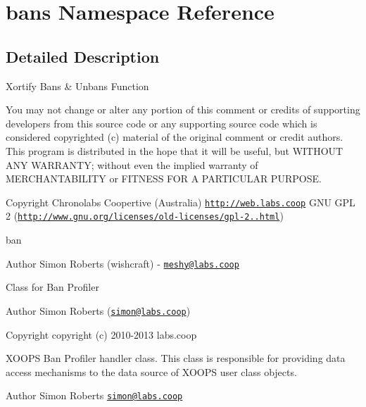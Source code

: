 \hypertarget{namespacebans}{\section{bans Namespace Reference}
\label{namespacebans}
}


\subsection{Detailed Description}
Xortify Bans \& Unbans Function

You may not change or alter any portion of this comment or credits of supporting developers from this source code or any supporting source code which is considered copyrighted (c) material of the original comment or credit authors. This program is distributed in the hope that it will be useful, but W\-I\-T\-H\-O\-U\-T A\-N\-Y W\-A\-R\-R\-A\-N\-T\-Y; without even the implied warranty of M\-E\-R\-C\-H\-A\-N\-T\-A\-B\-I\-L\-I\-T\-Y or F\-I\-T\-N\-E\-S\-S F\-O\-R A P\-A\-R\-T\-I\-C\-U\-L\-A\-R P\-U\-R\-P\-O\-S\-E.

\begin{DoxyCopyright}{Copyright}
Chronolabs Coopertive (Australia) \href{http://web.labs.coop}{\tt http\-://web.\-labs.\-coop}  G\-N\-U G\-P\-L 2 (\href{http://www.gnu.org/licenses/old-licenses/gpl-2.0.html}{\tt http\-://www.\-gnu.\-org/licenses/old-\/licenses/gpl-\/2..\-html})
\end{DoxyCopyright}
ban \begin{DoxyAuthor}{Author}
Simon Roberts (wishcraft) -\/ \href{mailto:meshy@labs.coop}{\tt meshy@labs.\-coop}
\end{DoxyAuthor}
Class for Ban Profiler \begin{DoxyAuthor}{Author}
Simon Roberts (\href{mailto:simon@labs.coop}{\tt simon@labs.\-coop}) 
\end{DoxyAuthor}
\begin{DoxyCopyright}{Copyright}
copyright (c) 2010-\/2013 labs.\-coop
\end{DoxyCopyright}
X\-O\-O\-P\-S Ban Profiler handler class. This class is responsible for providing data access mechanisms to the data source of X\-O\-O\-P\-S user class objects.

\begin{DoxyAuthor}{Author}
Simon Roberts \href{mailto:simon@labs.coop}{\tt simon@labs.\-coop} 
\end{DoxyAuthor}
